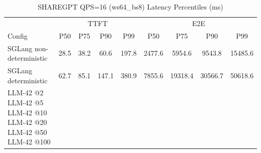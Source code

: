 \begin{table}[htbp]
\centering
\caption{SHAREGPT QPS=16 (ws64_bs8) Latency Percentiles (ms)}
\label{tab:sharegpt_qps16_ws64_bs8}
\begin{tabular}{l|cccc|cccc}
\toprule
& \multicolumn{4}{c|}{TTFT} & \multicolumn{4}{c}{E2E} \\
Config & P50 & P75 & P90 & P99 & P50 & P75 & P90 & P99 \\
\midrule
SGLang non-deterministic & 28.5 & 38.2 & 60.6 & 197.8 & 2477.6 & 5954.6 & 9543.8 & 15485.6 \\
SGLang deterministic & 62.7 & 85.1 & 147.1 & 380.9 & 7855.6 & 19318.4 & 30566.7 & 50618.6 \\
LLM-42 @2%
LLM-42 @5%
LLM-42 @10%
LLM-42 @20%
LLM-42 @50%
LLM-42 @100%
\bottomrule
\end{tabular}
\end{table}
